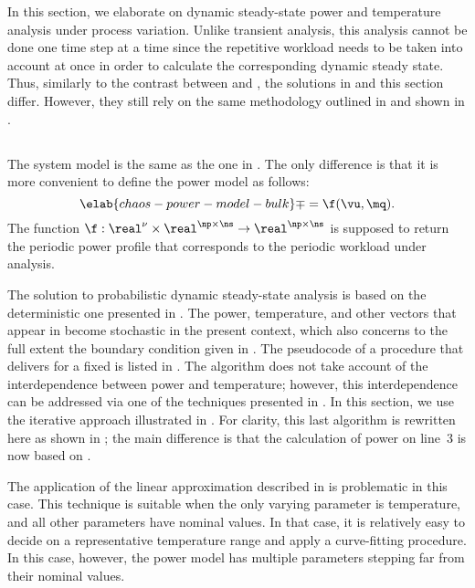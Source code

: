 In this section, we elaborate on dynamic steady-state power and temperature
analysis under process variation. Unlike transient analysis, this analysis
cannot be done one time step at a time since the repetitive workload needs to be
taken into account at once in order to calculate the corresponding dynamic
steady state. Thus, similarly to the contrast between 
and , the solutions in
 and this section differ. However, they still
rely on the same methodology outlined in  and
shown in .

\subsection{\problemtitle}

The system model is the same as the one in . The
only difference is that it is more convenient to define the power model as
follows:
\begin{equation} \elab{chaos-power-model-bulk}
  \mp = \f(\vu, \mq).
\end{equation}
The function $\f: \real^\nu \times \real^{\np \times \ns} \to \real^{\np \times
\ns}$ is supposed to return the periodic power profile that corresponds to the
periodic workload under analysis.

The solution to probabilistic dynamic steady-state analysis is based on the
deterministic one presented in . The power,
temperature, and other vectors that appear in 
become stochastic in the present context, which also concerns to the full extent
the boundary condition given in . The pseudocode
of a procedure that delivers \mq for a fixed \vu is listed in
. The algorithm does not take account of the
interdependence between power and temperature; however, this interdependence can
be addressed via one of the techniques presented in . In
this section, we use the iterative approach illustrated in
. For clarity, this last algorithm
is rewritten here as shown in ;
the main difference is that the calculation of power on line~3 is now based on
.

\begin{remark}
The application of the linear approximation described in
 is problematic in this case. This technique is suitable
when the only varying parameter is temperature, and all other parameters have
nominal values. In that case, it is relatively easy to decide on a
representative temperature range and apply a curve-fitting procedure. In this
case, however, the power model has multiple parameters stepping far from their
nominal values.
\end{remark}

